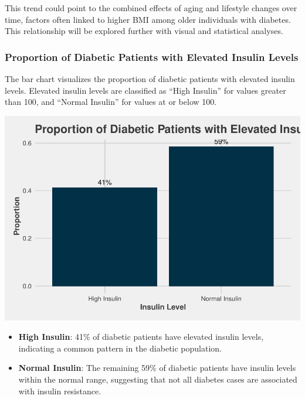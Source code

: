 \documentclass[
]{article}
\providecommand{\tightlist}{%
  \setlength{\itemsep}{0pt}\setlength{\parskip}{0pt}}
\begin{document}
This trend could point to the combined effects of aging and lifestyle
changes over time, factors often linked to higher BMI among older
individuals with diabetes. This relationship will be explored further
with visual and statistical analyses.

\newpage

\subsubsection{Proportion of Diabetic Patients with Elevated Insulin
Levels}\label{proportion-of-diabetic-patients-with-elevated-insulin-levels}

The bar chart visualizes the proportion of diabetic patients with
elevated insulin levels. Elevated insulin levels are classified as
``High Insulin'' for values greater than 100, and ``Normal Insulin'' for
values at or below 100.

\begin{center}\includegraphics{Diabetes-Project_files/figure-latex/Insulin levels-1} \end{center}

\begin{itemize}
\tightlist
\item
  \textbf{High Insulin}: 41\% of diabetic patients have elevated insulin
  levels, indicating a common pattern in the diabetic population.
\item
  \textbf{Normal Insulin}: The remaining 59\% of diabetic patients have
  insulin levels within the normal range, suggesting that not all
  diabetes cases are associated with insulin resistance.
\end{itemize}
\end{document}
